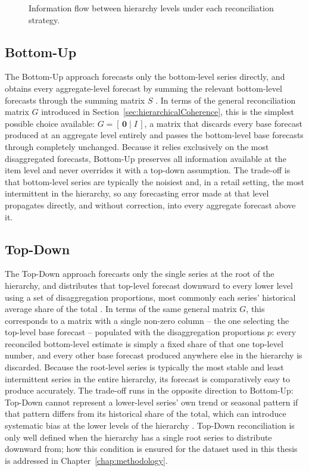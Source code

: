 \begin{figure}[H]
	\centering
	\resizebox{\textwidth}{!}{}
	\caption{Information flow between hierarchy levels under each reconciliation strategy.}\label{fig:reconciliationFlow}
\end{figure}

\subsection{Bottom-Up}
\label{subsec:bottomUp}

The Bottom-Up approach forecasts only the bottom-level series directly, and obtains every aggregate-level forecast by summing the relevant bottom-level forecasts through the summing matrix $S$ \cite{Orcutt:1968, Dunn:1976}. In terms of the general reconciliation matrix $G$ introduced in Section~\ref{sec:hierarchicalCoherence}, this is the simplest possible choice available: $G = [\, \mathbf{0} \mid I \,]$, a matrix that discards every base forecast produced at an aggregate level entirely and passes the bottom-level base forecasts through completely unchanged. Because it relies exclusively on the most disaggregated forecasts, Bottom-Up preserves all information available at the item level and never overrides it with a top-down assumption. The trade-off is that bottom-level series are typically the noisiest and, in a retail setting, the most intermittent in the hierarchy, so any forecasting error made at that level propagates directly, and without correction, into every aggregate forecast above it.

\subsection{Top-Down}
\label{subsec:topDown}

The Top-Down approach forecasts only the single series at the root of the hierarchy, and distributes that top-level forecast downward to every lower level using a set of disaggregation proportions, most commonly each series' historical average share of the total \cite{Gross:1990}. In terms of the same general matrix $G$, this corresponds to a matrix with a single non-zero column -- the one selecting the top-level base forecast -- populated with the disaggregation proportions $p$: every reconciled bottom-level estimate is simply a fixed share of that one top-level number, and every other base forecast produced anywhere else in the hierarchy is discarded. Because the root-level series is typically the most stable and least intermittent series in the entire hierarchy, its forecast is comparatively easy to produce accurately. The trade-off runs in the opposite direction to Bottom-Up: Top-Down cannot represent a lower-level series' own trend or seasonal pattern if that pattern differs from its historical share of the total, which can introduce systematic bias at the lower levels of the hierarchy \cite{Wickramasuriya:2019}. Top-Down reconciliation is only well defined when the hierarchy has a single root series to distribute downward from; how this condition is ensured for the dataset used in this thesis is addressed in Chapter~\ref{chap:methodology}.

